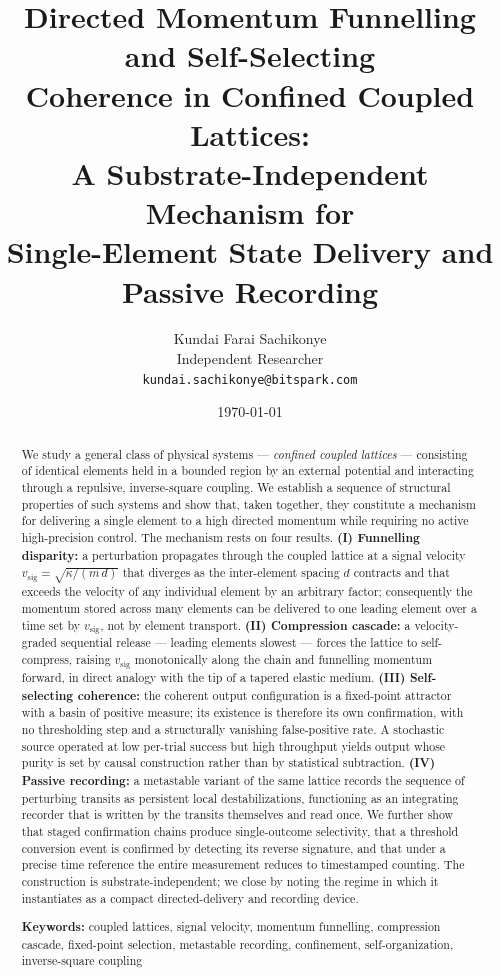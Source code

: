\documentclass[twocolumn,10pt,a4paper]{article}
\title{\textbf{Directed Momentum Funnelling and Self-Selecting\\
Coherence in Confined Coupled Lattices:\\
A Substrate-Independent Mechanism for\\
Single-Element State Delivery and Passive Recording}}
\author{
Kundai Farai Sachikonye\\
Independent Researcher\\
\texttt{kundai.sachikonye@bitspark.com}
}
\date{\today}
\theoremstyle{thmstyle}
\theoremstyle{definition}
\theoremstyle{remark}
\newcommand{\vsig}{v_{\mathrm{sig}}}
\begin{document}
\maketitle

\begin{abstract}
\noindent
We study a general class of physical systems --- \emph{confined coupled
lattices} --- consisting of identical elements held in a bounded region by
an external potential and interacting through a repulsive, inverse-square
coupling. We establish a sequence of structural properties of such systems
and show that, taken together, they constitute a mechanism for delivering a
single element to a high directed momentum while requiring no active
high-precision control. The mechanism rests on four results. \textbf{(I)
Funnelling disparity:} a perturbation propagates through the coupled lattice
at a signal velocity $\vsig=\sqrt{\kappa/(m\,d)}$ that diverges as the
inter-element spacing $d$ contracts and that exceeds the velocity of any
individual element by an arbitrary factor; consequently the momentum stored
across many elements can be delivered to one leading element over a time set
by $\vsig$, not by element transport. \textbf{(II) Compression cascade:} a
velocity-graded sequential release --- leading elements slowest --- forces
the lattice to self-compress, raising $\vsig$ monotonically along the chain
and funnelling momentum forward, in direct analogy with the tip of a tapered
elastic medium. \textbf{(III) Self-selecting coherence:} the coherent output
configuration is a fixed-point attractor with a basin of positive measure;
its existence is therefore its own confirmation, with no thresholding step
and a structurally vanishing false-positive rate. A stochastic source
operated at low per-trial success but high throughput yields output whose
purity is set by causal construction rather than by statistical subtraction.
\textbf{(IV) Passive recording:} a metastable variant of the same lattice
records the sequence of perturbing transits as persistent local
destabilizations, functioning as an integrating recorder that is written by
the transits themselves and read once. We further show that staged
confirmation chains produce single-outcome selectivity, that a threshold
conversion event is confirmed by detecting its reverse signature, and that
under a precise time reference the entire measurement reduces to timestamped
counting. The construction is substrate-independent; we close by noting the
regime in which it instantiates as a compact directed-delivery and recording
device.

\bigskip
\noindent\textbf{Keywords:} coupled lattices, signal velocity, momentum
funnelling, compression cascade, fixed-point selection, metastable
recording, confinement, self-organization, inverse-square coupling
\end{abstract}
\end{document}
